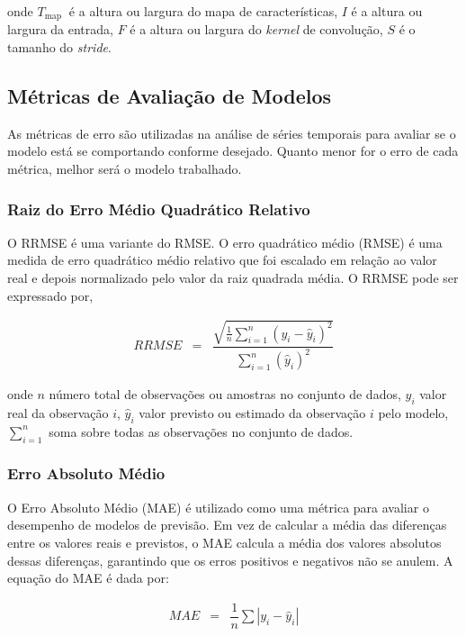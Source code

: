  \noindent onde
 $T_{\text {map }}$ é a altura ou largura do mapa de características,
 $I$ é a altura ou largura da entrada,
 $F$ é a altura ou largura do \textit{kernel} de convolução,
 $S$ é o tamanho do \textit{stride}.
 
 \subsection{M\'etricas de Avalia\c c\~ao de Modelos}\label{subsec:metrica}
 
 As métricas de erro são utilizadas na análise de séries temporais para avaliar se o modelo está se comportando conforme desejado. Quanto menor for o erro de cada métrica, melhor será o modelo trabalhado.
 
 
 \subsubsection{Raiz do Erro M\'edio Quadr\'atico Relativo}\label{subsub:rrmse}
 
 O RRMSE é uma variante do RMSE. O erro quadrático médio (RMSE) é uma medida de erro quadrático médio relativo que foi escalado em relação ao valor real e depois normalizado pelo valor da raiz quadrada média.  O RRMSE pode ser expressado por,
 
 \begin{eqnarray}
 	R R M S E&=&\dfrac{\sqrt{\frac{1}{n} \sum_{i=1}^n\left(y_i-\hat{y}_i\right)^2}}{\sum_{i=1}^n\left(\hat{y}_i\right)^2}
 \end{eqnarray}
 
 \noindent onde \(n\) número total de observações ou amostras no conjunto de dados,
 \(y_i\) valor real da observação \(i\),
 \(\hat{y}_i\) valor previsto ou estimado da observação \(i\) pelo modelo,
 \(\sum_{i=1}^{n}\) soma sobre todas as observações no conjunto de dados.
 
 \subsubsection{Erro Absoluto M\'edio}
 
 O Erro Absoluto Médio (MAE) é utilizado como uma métrica para avaliar o desempenho de modelos de previsão. Em vez de calcular a média das diferenças entre os valores reais e previstos, o MAE calcula a média dos valores absolutos dessas diferenças, garantindo que os erros positivos e negativos não se anulem.
 A equação do MAE é dada por:
 
 \begin{eqnarray}
 	M A E &=& \dfrac{1}{n} \sum\left|y_i-\hat{y}_i\right|\label{eq:mae}
 \end{eqnarray}
 
